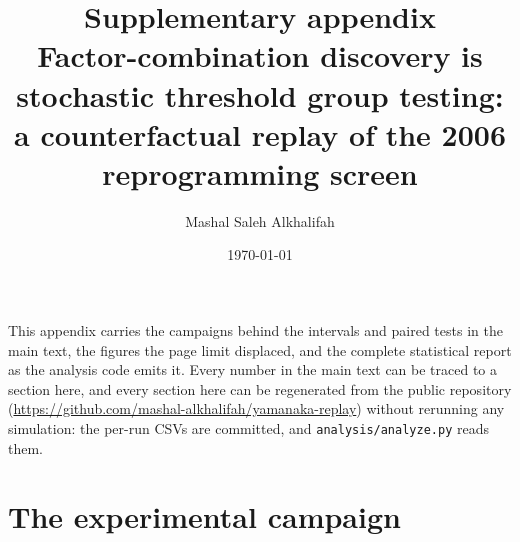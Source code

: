 \documentclass[10pt]{article}
\title{\textbf{Supplementary appendix}\\[2pt]
\large Factor-combination discovery is stochastic threshold group testing:
a counterfactual replay of the 2006 reprogramming screen}
\author{Mashal Saleh Alkhalifah}
\date{\today}
\begin{document}
\maketitle

\noindent
This appendix carries the campaigns behind the intervals and paired tests in
the main text, the figures the page limit displaced, and the complete
statistical report as the analysis code emits it. Every number in the main
text can be traced to a section here, and every section here can be
regenerated from the public repository
(\url{https://github.com/mashal-alkhalifah/yamanaka-replay}) without rerunning
any simulation: the per-run CSVs are committed, and
\texttt{analysis/analyze.py} reads them.

\tableofcontents

\section{The experimental campaign}
\end{document}
